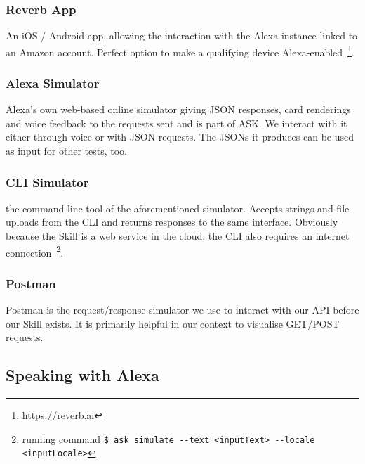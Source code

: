 	\subsubsection*{Reverb App}
	An iOS / Android app, allowing the interaction with the Alexa instance linked to an Amazon account. Perfect option to make a qualifying device Alexa-enabled~\footnote{\url{https://reverb.ai}}. 
	
\subsubsection*{Alexa Simulator}
	Alexa's own web-based online simulator giving JSON responses, card renderings and voice feedback to the requests sent and is part of ASK. We interact with it either through voice or with JSON requests. The JSONs it produces can be used as input for other tests, too. 
	
	\subsubsection*{CLI Simulator}
	the command-line tool of the aforementioned simulator. Accepts strings and file uploads from the CLI and returns responses to the same interface. Obviously because the Skill is a web service in the cloud, the CLI also requires an internet connection~\footnote{running command \lstinline|$ ask simulate --text <inputText> --locale <inputLocale>|}.
	
	
	\subsubsection*{Postman}
	Postman is the request/response simulator we use to interact with our API before our Skill exists. It is primarily helpful in our context to visualise GET/POST requests.
	






\subsection*{Speaking with Alexa}


